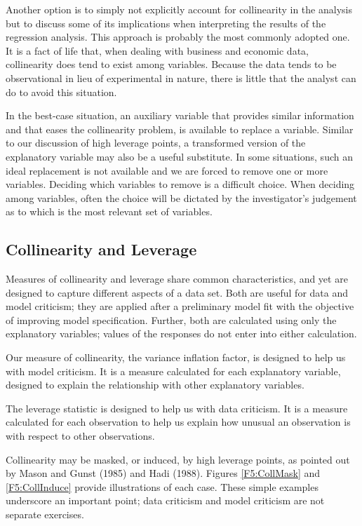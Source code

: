 Another option is to simply not explicitly account for collinearity in the
analysis but to discuss some of its implications when interpreting the
results of the regression analysis. This approach is probably the most
commonly adopted one. It is a fact of life that, when dealing with business
and economic data, collinearity does tend to exist among variables. Because
the data tends to be observational in lieu of experimental in nature, there
is little that the analyst can do to avoid this situation.


In the best-case situation, an auxiliary variable that provides
similar information and that eases the collinearity problem, is
available to replace a variable. Similar to our discussion of high
leverage points, a transformed version of the explanatory variable
may also be a useful substitute. In some situations, such an ideal
replacement is not available and we are forced to remove one or more
variables. Deciding which variables to remove is a difficult choice.
When deciding among variables, often the choice will be dictated by
the investigator's judgement as to which is the most relevant set of
variables.

\subsection{Collinearity and Leverage}

Measures of collinearity and leverage share common characteristics, and yet
are designed to capture different aspects of a data set. Both are useful for
data and model criticism; they are applied after a preliminary model fit
with the objective of improving model specification. Further, both are
calculated using only the explanatory variables; values of the responses do
not enter into either calculation.

Our measure of collinearity, the variance inflation factor, is designed to
help us with model criticism. It is a measure calculated for each
explanatory variable, designed to explain the relationship with other
explanatory variables.

The leverage statistic is designed to help us with data criticism. It is a
measure calculated for each observation to help us explain how unusual an
observation is with respect to other observations.

Collinearity may be masked, or induced, by high leverage points, as
pointed out by Mason and Gunst (1985) and Hadi (1988). Figures
\ref{F5:CollMask} and \ref{F5:CollInduce} provide illustrations of
each case. These simple examples underscore an important point; data
criticism and model criticism are not separate exercises.


